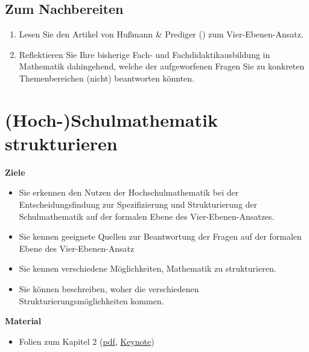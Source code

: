\documentclass[
]{scrbook}
\providecommand{\tightlist}{%
  \setlength{\itemsep}{0pt}\setlength{\parskip}{0pt}}
\renewenvironment{quote}{
  \list{}{
	\leftmargin0.2cm   %
    \rightmargin\leftmargin
      	\def\FrameCommand
    {%
        {\color{quoteColor}\vrule width 2pt}%
        \hspace{0pt}%
    }%
    \MakeFramed{\advance \hsize -\width \FrameRestore}    \color{quoteColor}
    }
  \item\relax
}
{\endlist\color{black}\endMakeFramed}
\theoremstyle{definition}
\theoremstyle{definition}
\theoremstyle{definition}
\theoremstyle{definition}
\theoremstyle{remark}
\begin{document}
\section{Zum Nachbereiten}\label{vier-ebenen-nachbereitung}

\begin{enumerate}
\def\labelenumi{\arabic{enumi}.}
\tightlist
\item
  Lesen Sie den Artikel von Hußmann \& Prediger () zum Vier-Ebenen-Ansatz.
\item
  Reflektieren Sie Ihre bisherige Fach- und Fachdidaktikausbildung in Mathematik dahingehend, welche der aufgeworfenen Fragen Sie zu konkreten Themenbereichen (nicht) beantworten könnten.
\end{enumerate}

\chapter{(Hoch-)Schulmathematik strukturieren}\label{hoch-schulmathematik-strukturieren}

\begin{quote}
\textbf{Ziele}

\begin{itemize}
\tightlist
\item
  Sie erkennen den Nutzen der Hochschulmathematik bei der Entscheidungsfindung zur Spezifizierung und Strukturierung der Schulmathematik auf der formalen Ebene des Vier-Ebenen-Ansatzes.
\item
  Sie kennen geeignete Quellen zur Beantwortung der Fragen auf der formalen Ebene des Vier-Ebenen-Ansatz\\
\item
  Sie kennen verschiedene Möglichkeiten, Mathematik zu strukturieren.\\
\item
  Sie können beschreiben, woher die verschiedenen Strukturierungsmöglichkeiten kommen.
\end{itemize}

\textbf{Material}

\begin{itemize}
\tightlist
\item
  Folien zum Kapitel 2 (\href{files/Stoffdidaktik2024-02-HochSchulmathematikStrukturieren.pdf}{pdf}, \href{files/Stoffdidaktik2024-02-HochSchulmathematikStrukturieren.key}{Keynote})
\end{itemize}
\end{quote}
\end{document}
